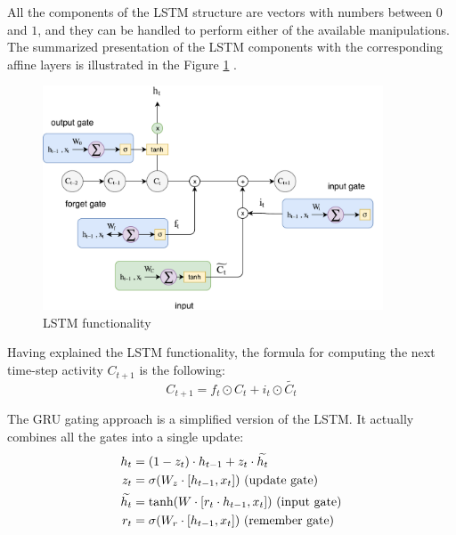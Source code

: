 All the components of the LSTM structure are vectors with numbers between $0$ and $1$, and they can be handled to perform either of the available manipulations. The summarized presentation of the LSTM components with the corresponding affine layers is illustrated in the Figure \ref{LSTMcore} \cite{NeonRNN}.
\begin{figure}[H]
	\centering
	\includegraphics[width=0.9\textwidth]{Figures/LSTM}
	\caption{LSTM functionality}
	\label{LSTMcore}
\end{figure}

Having explained the LSTM functionality, the formula for computing the next time-step activity $C_{t+1}$ is the following:
\begin{equation}\label{LSTM}
C_{t+1}=f_{t}\odot C_{t}+i_{t}\odot \widetilde{C_{t}}
\end{equation}

The GRU gating approach is a simplified version of the LSTM. It actually combines all the gates into a single update:
\begin{equation}\label{GRU}
\begin{aligned}
h_{t}&=(1-z_{t})\cdot h_{t-1}+z_{t}\cdot \widetilde{h_{t}}\\
z_{t}&=\sigma(W_{z}\cdot[h_{t-1},x_{t}]) \textup{ (update gate)}\\
\widetilde{h_{t}}&=\textup{tanh}(W\cdot[r_{t}\cdot h_{t-1},x_{t}]) \textup{ (input gate)}\\
r_{t}&=\sigma(W_{r}\cdot[h_{t-1},x_{t}]) \textup{ (remember gate)}
\end{aligned}
\end{equation}